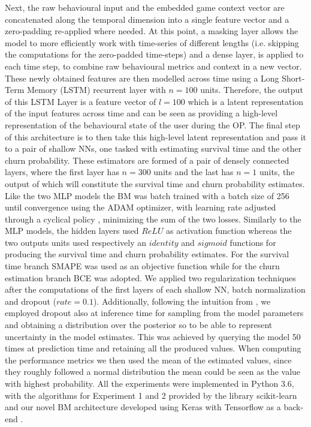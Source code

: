 Next, the raw behavioural input and the embedded game context vector are concatenated along the temporal dimension into a single feature vector and a zero-padding re-applied where needed. At this point, a masking layer allows the model to more efficiently work with time-series of different lengths (i.e. skipping the computations for the zero-padded time-steps) and a dense layer, is applied to each time step, to combine raw behavioural metrics and context in a new vector. These newly obtained features are then modelled across time using a Long Short-Term Memory (LSTM) recurrent layer with $n = 100$ units. Therefore, the output of this LSTM Layer is a feature vector of $l = 100$ which is a latent representation of the input features across time and can be seen as providing a high-level representation of the behavioural state of the user during the OP. The final step of this architecture is to then take this high-level latent representation and pass it to a pair of shallow NNs, one tasked with estimating survival time and the other churn probability. These estimators are formed of a pair of densely connected layers, where the first layer has $n = 300$ units and the last has $n = 1$ units, the output of which will constitute the survival time and churn probability estimates. Like the two MLP models the BM was batch trained with a batch size of 256 until convergence using the ADAM optimizer, with learning rate adjusted through a cyclical policy \cite{smith2017cyclical, chollet2015keras}, minimizing the sum of the two losses. Similarly to the MLP models, the hidden layers used $ReLU$ as activation function whereas the two outputs units used respectively an $identity$ and $sigmoid$ functions for producing the survival time and churn probability estimates. For the survival time branch SMAPE was used as an objective function while for the churn estimation branch BCE was adopted. We applied two regularization techniques after the computations of the first layers of each shallow NN, batch normalization \cite{ioffe2015batch} and dropout \cite{srivastava2014dropout} ($rate = 0.1$). Additionally, following the intuition from \cite{gal2016dropout}, we employed dropout also at inference time for sampling from the model parameters and obtaining a distribution over the posterior so to be able to represent uncertainty in the model estimates. This was achieved by querying the model 50 times at prediction time and retaining all the produced values. When computing the performance metrics we then used the mean of the estimated values, since they roughly followed a normal distribution the mean could be seen as the value with highest probability. All the experiments were implemented in Python 3.6, with the algorithms for Experiment 1 and 2 provided by the library scikit-learn \cite{scikit-learn} and our novel BM architecture developed using Keras with Tensorflow as a back-end \cite{chollet2015keras}.

